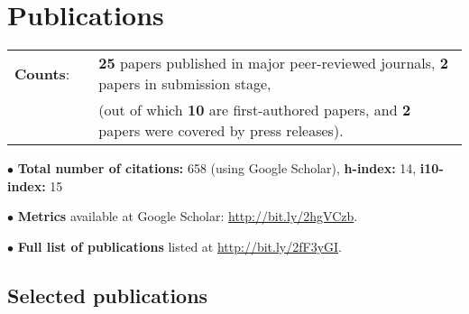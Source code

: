 \documentclass[11pt,letterpaper,sans]{moderncv}
\begin{document}
\vspace{-3mm}
\section{Publications}

\cvitem{}
{
\begin{tabular}{rcl}
\textbf{Counts}: &\hspace{0.3cm} &{\textbf{25} papers published in major peer-reviewed journals}, {\textbf{2} papers in submission stage,} \\
& &{(out of which \textbf{10} are first-authored papers, and \textbf{2} papers were covered by press releases).}
\end{tabular}
}

$\bullet$ \textbf{Total number of citations:} 658 (using Google Scholar), \textbf{h-index:} 14, \textbf{i10-index:} 15

$\bullet$ \textbf{Metrics} available at Google Scholar: {\color{color1} \href{http://bit.ly/2hgVCzb}{http://bit.ly/2hgVCzb}}.

$\bullet$ \textbf{Full list of publications} listed at {\color{color1} \href{http://bit.ly/2fF3yGI}{http://bit.ly/2fF3yGI}}.

\subsection{Selected publications}
\end{document}
